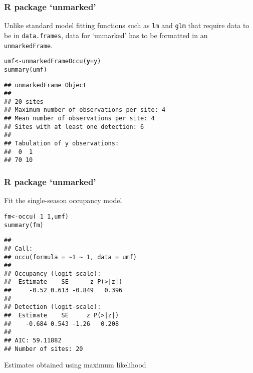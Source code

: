 \documentclass[color=usenames,dvipsnames]{beamer}\usepackage[]{graphicx}\usepackage[]{xcolor}
\makeatletter
\newcommand{\hlnum}[1]{\textcolor[rgb]{0.69,0.494,0}{#1}}%
\newcommand{\hlopt}[1]{\textcolor[rgb]{0,0,0}{#1}}%
\newcommand{\hldef}[1]{\textcolor[rgb]{0,0,0}{#1}}%
\newcommand{\hlkwb}[1]{\textcolor[rgb]{0,0.341,0.682}{#1}}%
\newcommand{\hlkwc}[1]{\textcolor[rgb]{0,0,0}{\textbf{#1}}}%
\newcommand{\hlkwd}[1]{\textcolor[rgb]{0.004,0.004,0.506}{#1}}%
\newenvironment{kframe}{%
 \def\at@end@of@kframe{}%
 \ifinner\ifhmode%
  \def\at@end@of@kframe{\end{minipage}}%
  \begin{minipage}{\columnwidth}%
 \fi\fi%
 \def\FrameCommand##1{\hskip\@totalleftmargin \hskip-\fboxsep
 \colorbox{shadecolor}{##1}\hskip-\fboxsep
     \hskip-\linewidth \hskip-\@totalleftmargin \hskip\columnwidth}%
 \MakeFramed {\advance\hsize-\width
   \@totalleftmargin\z@ \linewidth\hsize
   \@setminipage}}%
 {\par\unskip\endMakeFramed%
 \at@end@of@kframe}
\newenvironment{knitrout}{}{} %
\newcommand{\inr}[1]{\colorbox{inlinecolor}{\texttt{#1}}}
\makeatother
\begin{document}
\begin{frame}[fragile]
  \frametitle{R package `unmarked'}
  Unlike standard model fitting functions such as \inr{lm} and \inr{glm} 
  that require data to be in \texttt{data.frames}, data for `unmarked'
  has to be formatted in an \inr{unmarkedFrame}.
\begin{knitrout}\small
{}\color{fgcolor}\begin{kframe}
\begin{alltt}
\hldef{umf} \hlkwb{<-} \hlkwd{unmarkedFrameOccu}\hldef{(}\hlkwc{y}\hldef{=y)}
\hlkwd{summary}\hldef{(umf)}
\end{alltt}
\begin{verbatim}
## unmarkedFrame Object
## 
## 20 sites
## Maximum number of observations per site: 4 
## Mean number of observations per site: 4 
## Sites with at least one detection: 6 
## 
## Tabulation of y observations:
##  0  1 
## 70 10
\end{verbatim}
\end{kframe}
\end{knitrout}
\end{frame}





\begin{frame}[fragile]
  \frametitle{R package `unmarked'}
  \small
Fit the single-season occupancy model
\begin{knitrout}\scriptsize
{}\color{fgcolor}\begin{kframe}
\begin{alltt}
\hldef{fm} \hlkwb{<-} \hlkwd{occu}\hldef{(}\hlopt{~}\hlnum{1} \hlopt{~}\hlnum{1}\hldef{, umf)}
\hlkwd{summary}\hldef{(fm)}
\end{alltt}
\begin{verbatim}
## 
## Call:
## occu(formula = ~1 ~ 1, data = umf)
## 
## Occupancy (logit-scale):
##  Estimate    SE      z P(>|z|)
##     -0.52 0.613 -0.849   0.396
## 
## Detection (logit-scale):
##  Estimate    SE     z P(>|z|)
##    -0.684 0.543 -1.26   0.208
## 
## AIC: 59.11882 
## Number of sites: 20
\end{verbatim}
\end{kframe}
\end{knitrout}
Estimates obtained using maximum likelihood
\end{frame}
\end{document}
